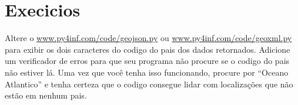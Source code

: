 \section{Execicios}

\begin{ex}
Altere o
\url{www.py4inf.com/code/geojson.py} ou
\url{www.py4inf.com/code/geoxml.py} para exibir os
dois caracteres do codigo do pais dos dados retornados.
Adicione um verificador de erros para que seu programa
não procure se o codigo do pais não estiver lá. Uma vez
que você tenha isso funcionando, procure por 
``Oceano Atlantico'' e tenha certeza que o codigo consegue
lidar com localizações que não estão em nenhum pais.
\end{ex}

